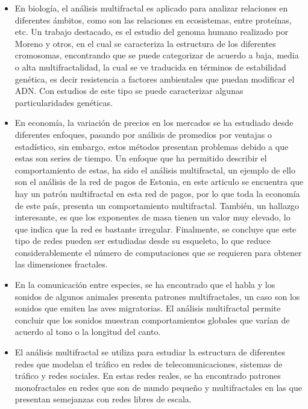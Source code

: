 \begin{itemize}
    \item En biología, el análisis multifractal es aplicado para analizar relaciones en diferentes ámbitos\cite{Barat2016}, como son las relaciones en ecosistemas, entre proteínas\cite{Wang2014}, etc. Un trabajo destacado, es el estudio del genoma humano realizado por Moreno y otros\cite{Moreno2011}, en el cual se caracteriza la estructura de los diferentes cromosomas, encontrando que se puede categorizar de acuerdo a baja, media o alta multifractalidad, la cual se ve traducida en términos de estabilidad genética, es decir resistencia a factores ambientales que puedan modificar el ADN. Con estudios de este tipo se puede caracterizar algunas particularidades genéticas.
    \item En economía, la variación de precios en los mercados se ha estudiado desde diferentes enfoques, pasando por análisis de promedios por ventajas o estadístico, sin embargo, estos métodos presentan problemas debido a que estas son series de tiempo\cite{Siokis2014}. Un enfoque que ha permitido describir el comportamiento de estas, ha sido el análisis multifractal, un ejemplo de ello son el análisis de la red de pagos de Estonia\cite{RendondelaTorre2017}, en este articulo se encuentra que hay un patrón multifractal en esta red de pagos, por lo que toda la economía de este país, presenta un comportamiento multifractal. También, un hallazgo interesante, es que los exponentes de masa tienen un valor muy elevado, lo que indica que la red es bastante irregular. Finalmente, se concluye que este tipo de redes pueden ser estudiadas desde su esqueleto, lo que reduce considerablemente el número de computaciones que se requieren para obtener las dimensiones fractales.
    \item En la comunicación entre especies, se ha encontrado que el habla y los sonidos de algunos animales presenta patrones multifractales, un caso son los sonidos que emiten las aves migratorias\cite{Roeske2018}. El análisis multifractal permite concluir que los sonidos muestran comportamientos globales que varían de acuerdo al tono o la longitud del canto.
    \item El análisis multifractal se utiliza para estudiar la estructura de diferentes redes que modelan el tráfico en redes de telecomunicaciones\cite{DinhDang2004}, sistemas de tráfico\cite{Vojak1994} y redes sociales\cite{Wei2017}. En estas redes reales, se ha encontrado patrones monofractales en redes que son de mundo pequeño y multifractales en las que presentan semejanzas con redes libres de escala.
\end{itemize}


